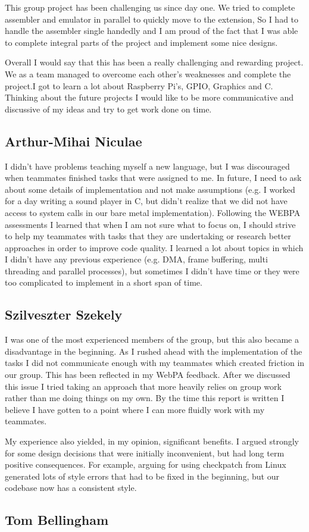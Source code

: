 \documentclass[11pt]{article}
\begin{document}
This group project has been challenging us since day one. We tried to complete
assembler and emulator in parallel to quickly move to the extension, So I had
to handle the assembler single handedly and I am proud of the fact that I was 
able to complete integral parts of the project and implement some nice designs.

Overall I would say that this has been a really challenging and rewarding
project. We as a team managed to overcome each other's weaknesses and complete
the project.I got to learn a lot about Raspberry Pi's, GPIO, Graphics and C.
Thinking about the future projects I would like to be more communicative and
discussive of my ideas and try to get work done on time.

\subsection{Arthur-Mihai Niculae}
I didn’t have problems teaching myself a new language, but I was discouraged
when teammates finished tasks that were assigned to me. In future, I need to ask
about some details of implementation and not make assumptions (e.g. I worked
for a day writing a sound player in C, but didn’t realize that we did not have
access to system calls in our bare metal implementation). Following the WEBPA
assessments I learned that when I am not sure what to focus on, I should strive
to help my teammates with tasks that they are undertaking or research better
approaches in order to improve code quality. I learned a lot about topics
in which I didn’t have any previous experience (e.g. DMA, frame  buffering,
multi threading and parallel processes), but sometimes I didn’t have time or
they were too complicated to implement in a short span of time.

\subsection{Szilveszter Szekely}

I was one of the most experienced members of the group, but this also became
a disadvantage in the beginning. As I rushed ahead with the implementation of
the tasks I did not communicate enough with my teammates which created friction
in our group. This has been reflected in my WebPA feedback. After we discussed
this issue I tried taking an approach that more heavily relies on group work
rather than me doing things on my own. By the time this report is written
I believe I have gotten to a point where I can more fluidly work with my
teammates.

My experience also yielded, in my opinion, significant benefits. I argued
strongly for some design decisions that were initially inconvenient, but had
long term positive consequences. For example, arguing for using checkpatch from
Linux generated lots of style errors that had to be fixed in the beginning, but
our codebase now has a consistent style.

\subsection{Tom Bellingham}
\end{document}
